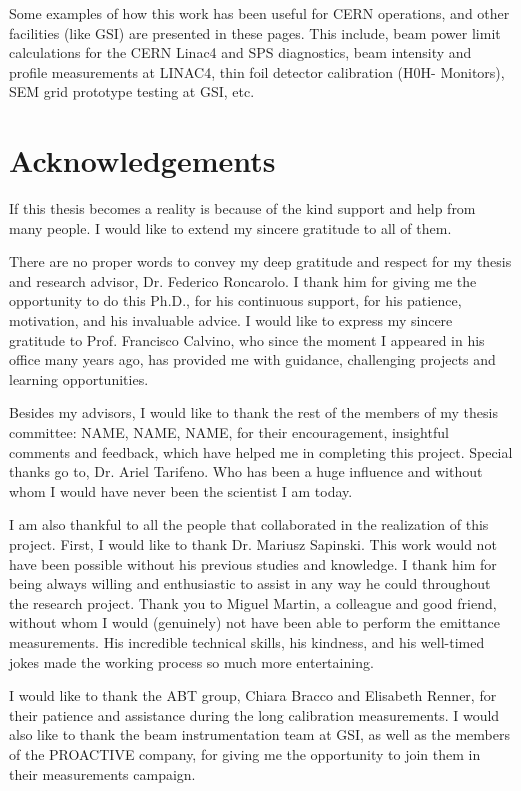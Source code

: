 Some examples of how this work has been useful for CERN operations, and other facilities (like GSI) are presented in these pages. This include, beam power limit calculations for the CERN Linac4 and SPS diagnostics, beam intensity and profile measurements at LINAC4, thin foil detector calibration (H0H- Monitors), SEM grid prototype testing at GSI, etc. 

\chapter*{Acknowledgements} \label{Acknowledgements}

If this thesis becomes a reality is because of the kind support and help from many people. I would like to extend my sincere gratitude to all of them. 

There are no proper words to convey my deep gratitude and respect for my thesis
and research advisor, Dr. Federico Roncarolo. I thank him for giving me the opportunity to do this Ph.D., for his continuous support, for his patience, motivation, and his invaluable advice. I would like to express my sincere gratitude to Prof. Francisco Calvino, who since the moment I appeared in his office many years ago, has provided me with guidance, challenging projects and learning opportunities.

Besides my advisors, I would like to thank the rest of the members of my thesis committee: NAME, NAME, NAME, for their encouragement, insightful comments and feedback, which have helped me in completing this project. Special thanks go to, Dr. Ariel Tarifeno. Who has been a huge influence and without whom I would have never been the scientist I am today. 

I am also thankful to all the people that collaborated in the realization of this project. First, I would like to thank Dr. Mariusz Sapinski. This work would not have been possible without his previous studies and knowledge. I thank him for being always willing and enthusiastic to assist in any way he could throughout the research project. Thank you to Miguel Martin, a colleague and good friend, without whom I would (genuinely) not have been able to perform the emittance measurements. His incredible technical skills, his kindness, and his well-timed jokes made the working process so much more entertaining. 

I would like to thank the ABT group, Chiara Bracco and Elisabeth Renner, for their patience and assistance during the long calibration measurements. I would also like to thank the beam instrumentation team at GSI, as well as the members of the PROACTIVE company, for giving me the opportunity to join them in their measurements campaign. 

